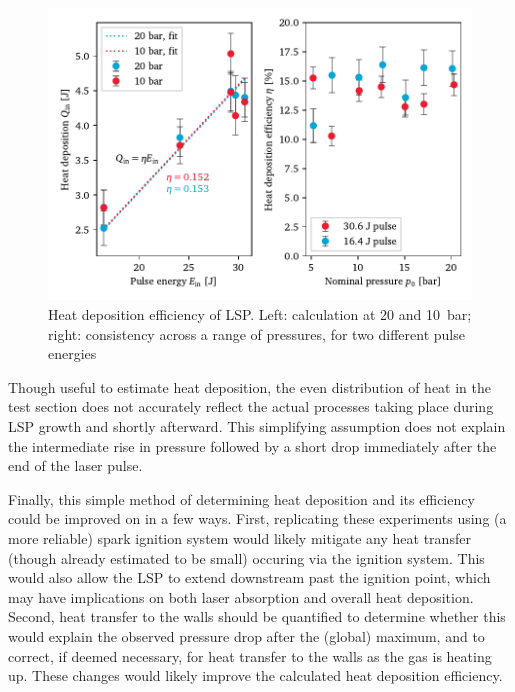             \begin{figure}[h]
                \centering
                \includegraphics[]{assets/5 results/heatEfficiency}
                \caption[Heat deposition efficiency of LSP]{Heat deposition efficiency of LSP. Left: calculation at 20 and 10~bar; right: consistency across a range of pressures, for two different pulse energies}
                \label{fig:heatEfficiency}
            \end{figure}

            Though useful to estimate heat deposition, the even distribution of heat in the test section does not accurately reflect the actual processes taking place during LSP growth and shortly afterward. This simplifying assumption does not explain the intermediate rise in pressure followed by a short drop immediately after the end of the laser pulse.

            Finally, this simple method of determining heat deposition and its efficiency could be improved on in a few ways. First, replicating these experiments using (a more reliable) spark ignition system would likely mitigate any heat transfer (though already estimated to be small) occuring via the ignition system. This would also allow the LSP to extend downstream past the ignition point, which may have implications on both laser absorption and overall heat deposition. Second, heat transfer to the walls should be quantified to determine whether this would explain the observed pressure drop after the (global) maximum, and to correct, if deemed necessary, for heat transfer to the walls as the gas is heating up. These changes would likely improve the calculated heat deposition efficiency.
    
